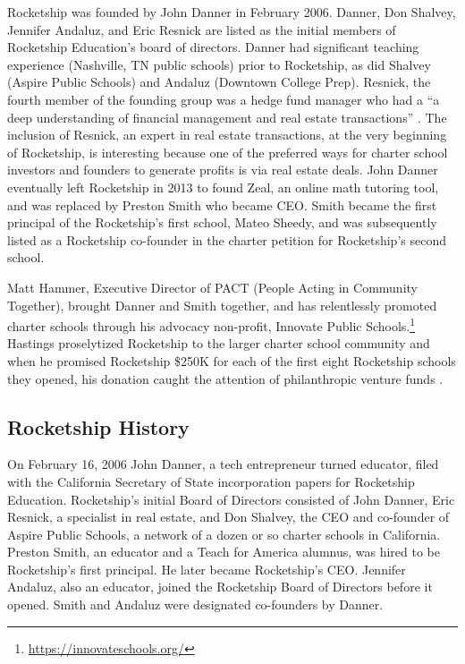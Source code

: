 Rocketship was founded by John Danner in February 2006. Danner, Don Shalvey, Jennifer Andaluz, and Eric Resnick are listed as the initial members of Rocketship Education's board of directors. Danner had significant teaching experience (Nashville, TN public schools) prior to Rocketship, as did Shalvey (Aspire Public Schools) and Andaluz (Downtown College Prep). Resnick, the fourth member of the founding group was a hedge fund manager who had a ``a deep understanding of financial management and real estate transactions'' \parencite[13]{Danner2006}. The inclusion of Resnick, an expert in real estate transactions, at the very beginning of Rocketship, is interesting because one of the preferred ways for charter school investors and founders to generate profits is via real estate deals. John Danner eventually left Rocketship in 2013 to found Zeal, an online math tutoring tool, and was replaced by Preston Smith who became CEO\@. Smith became the first principal of the Rocketship's first school, Mateo Sheedy, and was subsequently listed as a Rocketship co-founder in the charter petition for Rocketship's second school. %

Matt Hammer, Executive Director of PACT (People Acting in Community Together), brought Danner and Smith together, and has relentlessly promoted charter schools through his advocacy non-profit, Innovate Public  Schools.\footnote{\url{https://innovateschools.org/}} Hastings proselytized Rocketship to the larger charter school community and when he promised Rocketship \$250K for each of the first eight Rocketship schools they opened, his donation caught the attention of philanthropic venture funds \parencite[50]{Whitmire2014}. 

\subsection{Rocketship History}\label{sec:history}\indent

On February 16, 2006 John Danner, a tech entrepreneur turned educator, filed with the California Secretary of State incorporation papers for Rocketship Education. Rocketship's initial Board of Directors consisted of John Danner, Eric Resnick, a specialist in real estate, and Don Shalvey, the CEO and co-founder of Aspire Public Schools, a network of a dozen or so charter schools in California. Preston Smith, an educator and a Teach for America alumnus, was hired to be Rocketship's first principal. He later became Rocketship's CEO. Jennifer Andaluz, also an educator, joined the Rocketship Board of Directors before it opened. Smith and Andaluz were designated co-founders by Danner.

